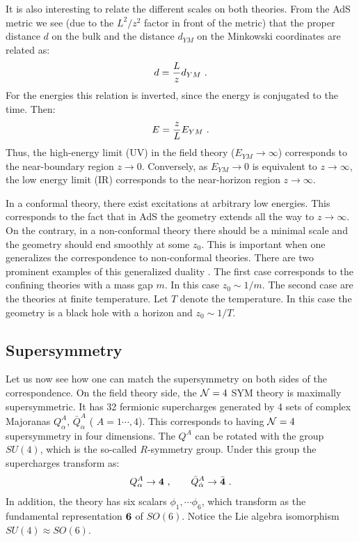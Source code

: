 \documentclass[12pt,notitlepage]{article}
\newcommand{\beq}{\begin{equation}}
\newcommand{\eeq}{\end{equation}}
\begin{document}
 
 It is also interesting to relate  the different scales on both theories. From the AdS metric we see (due to the $L^2/ z^2$ factor in front of the metric) that the proper distance $d$ on the bulk and the distance $d_{YM}$ on the Minkowski coordinates are related as:
\beq
d={L\over z} d_{YM}\,\,.
\eeq
For the energies this relation is inverted, since the energy is conjugated to the time. Then:
\beq
E={z\over L} E_{YM}\,\,.
\eeq
Thus, the high-energy limit (UV) in the field theory ($E_{YM}\to \infty$) corresponds to the near-boundary region $z\to 0$. Conversely, as $E_{YM}\to 0$ is equivalent to $z\to\infty$, the low energy limit (IR) corresponds to the near-horizon region $z\to\infty$. 
 
In a conformal theory, there exist excitations at arbitrary low energies. This corresponds to the fact that in AdS the geometry extends all the way to $z\to \infty$. On the contrary, in a non-conformal theory there should be a minimal scale and the geometry should end smoothly at some $z_0$. This is important when one generalizes the correspondence to non-conformal theories. There are two prominent examples of this generalized duality . The first case corresponds to the  confining theories with a mass gap $m$. In this case $z_0\sim 1/ m$. The second case are the theories at  finite temperature. Let $T$ denote the temperature. In this case the geometry is a black hole with a horizon and $z_0\sim 1/ T$. 
 



 \subsection{ Supersymmetry}

Let us now see how one can match the supersymmetry on both sides of the correspondence. On the field theory side,  the  ${\cal N}=4$ SYM theory  is maximally supersymmetric. It has 32 fermionic supercharges generated by 4 sets of complex Majoranas $Q_{\alpha}^{A}$, $\bar Q_{\dot\alpha}^{A}$ ( $A=1\cdots, 4$). This corresponds to having ${\cal N}=4$ supersymmetry  in four dimensions. The $Q^{A}$ can be rotated with the group $SU(4)$,  which is the so-called $R$-symmetry group. Under this group the supercharges transform as:
\beq
Q_{\alpha}^{A}\to {\bf 4}\,\,,
\qquad
\bar Q_{\dot\alpha}^{A}\to \bar{\bf 4}\,\,.
\eeq
In addition, the theory has six scalars $\phi_1,\cdots \phi_6$, which transform as the fundamental representation ${\bf 6}$ of $SO(6)$. Notice the Lie algebra isomorphism $SU(4)\approx SO(6)$. 
 
\end{document}
